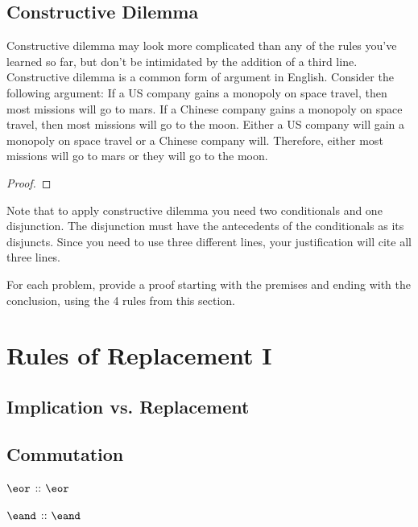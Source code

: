 \subsection{Constructive Dilemma}

Constructive dilemma may look more complicated than any of the rules you've learned so far, but don't be intimidated by the addition of a third line. Constructive dilemma is a common form of argument in English. Consider the following argument: If a US company gains a monopoly on space travel, then most missions will go to mars. If a Chinese company gains a monopoly on space travel, then most missions will go to the moon. Either a US company will gain a monopoly on space travel or a Chinese company will. Therefore, either most missions will go to mars or they will go to the moon.%

\begin{proof}
	 
\end{proof}

Note that to apply constructive dilemma you need two conditionals and one disjunction. The disjunction must have the antecedents of the conditionals as its disjuncts. Since you need to use three different lines, your justification will cite all three lines.


\practiceproblems
\noindent\problempart For each problem, provide a proof starting with the premises and ending with the conclusion, using the 4 rules from this section.

\section{Rules of Replacement I}

\subsection{Implication vs. Replacement}

\subsection{Commutation}

\begin{multicols}{2}

 $\eor$  ::  $\eor$ 

 $\eand$  ::  $\eand$ 

\end{multicols}

